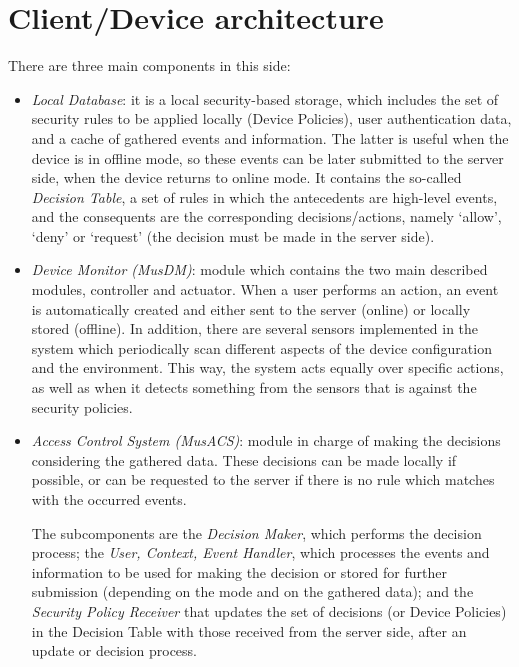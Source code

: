 \section{Client/Device architecture}
\label{subsec:client}

There are three main components in this side:
\begin{itemize}
 	 \item \textit{Local Database}: it is a local security-based storage, which includes the set of security rules to be applied locally (Device Policies), user authentication data, and a cache of gathered events and information. The latter is useful when the device is in offline mode, so these events can be later submitted to the server side, when the device returns to online mode. It contains the so-called \textit{Decision Table}, a set of rules in which the antecedents are high-level events, and the consequents are the corresponding decisions/actions, namely `allow', `deny' or `request' (the decision must be made in the server side).
 	 \item \textit{Device Monitor (MusDM)}: module which contains the two main described modules, controller and actuator. When a user performs an action, an event is automatically created and either sent to the server (online) or locally stored (offline). In addition, there are several sensors implemented in the system which periodically scan different aspects of the device configuration and the environment. This way, the system acts equally over specific actions, as well as when it detects something from the sensors that is against the security policies.
 	 \item \textit{Access Control System (MusACS)}: module in charge of making the decisions considering the gathered data. These decisions can be made locally if possible, or can be requested to the server if there is no rule which matches with the occurred events. 
 	 
 	 The subcomponents are the \textit{Decision Maker}, which performs the decision process; the \textit{User, Context, Event Handler}, which processes the events and information to be used for making the decision or stored for further submission (depending on the mode and on the gathered data); and the \textit{Security Policy Receiver} that updates the set of decisions (or Device Policies) in the Decision Table with those received from the server side, after an update or decision process.
\end{itemize}

